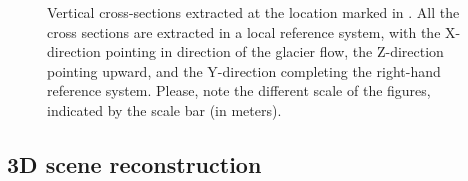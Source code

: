 \begin{figure}
\begin{center}
     \hspace{62mm}
  \end{center}
  \caption{Vertical cross-sections extracted at the location marked in
    .
    All the cross sections are extracted in a local reference system, with the
    X-direction pointing in direction of the glacier flow, the Z-direction pointing
    upward, and the Y-direction completing the right-hand reference system.
    Please, note the different scale of the figures, indicated by the scale bar (in
    meters).}
  \label{fig:4:sections}
\end{figure}

\subsection{3D scene reconstruction}\label{sec:4:res_3dreconstruction_results}


